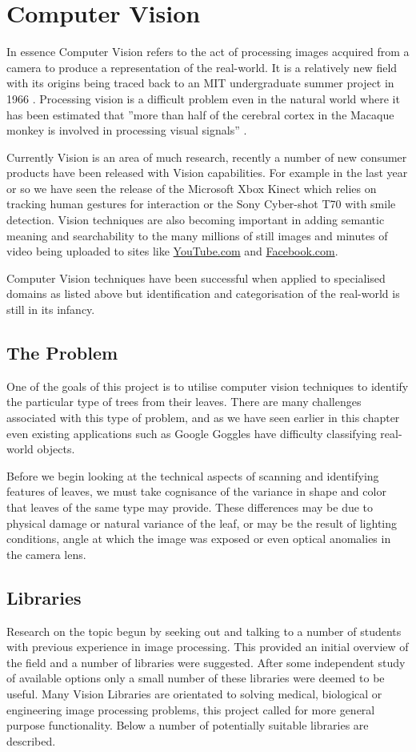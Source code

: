 \section{Computer Vision}
In essence Computer Vision refers to the act of processing images acquired from a camera to produce a representation of the real-world.  It is a relatively new field with its origins being traced back to an MIT undergraduate summer project in 1966 \cite{feili10}. Processing vision is a difficult problem even in the natural world where it has been estimated that ”more than half of the cerebral cortex in the Macaque monkey is involved in processing visual signals” \cite{wilson99}.

Currently Vision is an area of much research, recently a number of new consumer products have been released with Vision capabilities. For example in the last year or so we have seen the release of the Microsoft Xbox Kinect which relies on tracking human gestures for interaction or the Sony Cyber-shot T70 with smile detection.  Vision techniques are also becoming important in adding semantic meaning and searchability to the many millions of still images and minutes of video being uploaded to sites like \url{YouTube.com} and \url{Facebook.com}. 

Computer Vision techniques have been successful when applied to specialised domains as listed above but identification and categorisation of the real-world is still in its infancy.

\subsection{The Problem}
One of the goals of this project is to utilise computer vision techniques to identify the particular type of trees from their leaves. There are many challenges associated with this type of problem, and as we have seen earlier in this chapter even existing applications such as Google Goggles have difficulty classifying real-world objects.

Before we begin looking at the technical aspects of scanning and identifying features of leaves, we must take cognisance of the variance in shape and color that leaves of the same type may provide. These differences may be due to physical damage or natural variance of the leaf, or may be the result of lighting conditions, angle at which the image was exposed or even optical anomalies in the camera lens.

\subsection{Libraries}
Research on the topic begun by seeking out and talking to a number of students with previous experience in image processing. This provided an initial overview of the field and a number of libraries were suggested. After some independent study of available options only a small number of these libraries were deemed to be useful. Many Vision Libraries are orientated to solving medical, biological or engineering image processing problems, this project called for more general purpose functionality. Below a number of potentially suitable libraries are described.

